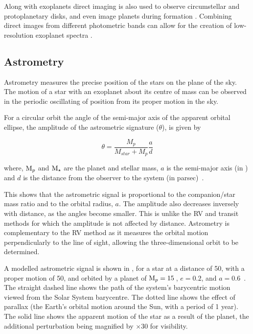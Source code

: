 Along with exoplanets direct imaging is also used to observe circumstellar and protoplanetary disks, and even image planets during formation \citep[e.g.][]{sallum_accreting_2015}.
Combining direct images from different photometric bands can allow for the creation of low-resolution exoplanet spectra \citep[e.g.][]{kuzuhara_direct_2013, zurlo_new_2015}.


\subsection{Astrometry}
\label{sub:astrometry}
Astrometry measures the precise position of the stars on the plane of the sky.
The motion of a star with an exoplanet about its centre of mass can be observed in the periodic oscillating of position from its proper motion in the sky.

For a circular orbit the angle of the semi-major axis of the apparent orbital ellipse, the amplitude of the astrometric signature ($\theta$), is given by

\begin{equation}
\theta = \frac{M_{p}}{M_{star} + M_{p}} \frac{a}{d}
\end{equation}

where, $\textrm{M}_{p}$ and $\textrm{M}_{\star}$ are the planet and stellar mass, $a$ is the semi-major axis (in \AU) and $d$ is the distance from the observer to the system (in parsec)~\citep{perryman_exoplanet_2011}.

This shows that the astrometric signal is proportional to the companion/star mass ratio and to the orbital radius, $a$.
The amplitude also decreases inversely with distance, as the angles become smaller.
This is unlike the {RV} and transit methods for which the amplitude is not affected by distance.
Astrometry is complementary to the {RV} method as it measures the orbital motion perpendicularly to the line of sight, allowing the three-dimensional orbit to be determined.

A modelled astrometric signal is shown in , for a star at a distance of 50\pc, with a proper motion of 50\masperyr{}, and orbited by a planet of $\textrm{M}_{p} = 15$\,\Mjup{}, $e = 0.2$, and $a = 0.6$\AU~\citep{perryman_extrasolar_2000}.
The straight dashed line shows the path of the system's barycentric motion viewed from the Solar System barycentre.
The dotted line shows the effect of parallax (the Earth's orbital motion around the Sun, with a period of 1 year).
The solid line shows the apparent motion of the star as a result of the planet, the additional perturbation being magnified by $\times 30$ for visibility.

